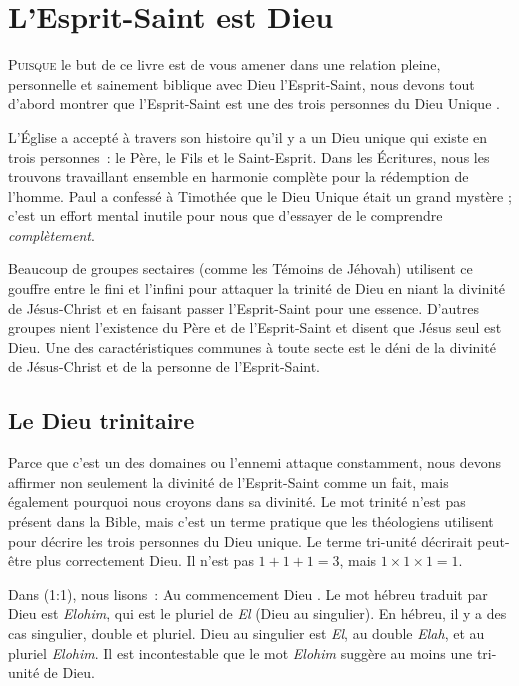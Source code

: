 \chapter{L'Esprit-Saint est Dieu}

\lettrine{P}{uisque} le but de ce livre est de vous amener
 dans une relation pleine, personnelle et sainement biblique avec
 Dieu l'Esprit-Saint, nous devons tout d'abord montrer que l'Esprit-Saint
 est une des trois personnes du Dieu Unique
 .

L'Église a accepté à travers son histoire qu'il y a un Dieu unique
 qui existe en trois personnes~: le Père, le Fils et le Saint-Esprit.
 Dans les Écritures, nous les trouvons travaillant ensemble en harmonie
 complète pour la rédemption de l'homme.
 Paul a confessé à Timothée que le Dieu Unique était un grand mystère ;
 c'est un effort mental inutile pour nous que d'essayer de le comprendre
 \emph{complètement}.

Beaucoup de groupes sectaires (comme les Témoins de Jéhovah) utilisent
 ce gouffre entre le fini et l'infini pour attaquer la trinité de Dieu
 en niant la divinité de Jésus-Christ et en faisant passer l'Esprit-Saint
 pour une essence.
 D'autres groupes nient l'existence du Père et de l'Esprit-Saint et disent
 que Jésus seul est Dieu.
 Une des caractéristiques communes à toute secte est le déni de la divinité
 de Jésus-Christ et de la personne de l'Esprit-Saint.

\section*{Le Dieu trinitaire}

Parce que c'est un des domaines ou l'ennemi attaque constamment, nous devons
 affirmer non seulement la divinité de l'Esprit-Saint comme un fait,
 mais également pourquoi nous croyons dans sa divinité.
 Le mot \og trinité \fg{} n'est pas présent dans la Bible, mais c'est un
 terme pratique que les théologiens utilisent pour décrire les trois personnes
 du Dieu unique.
 Le terme \og tri-unité \fg{} décrirait peut-être plus correctement Dieu.
 Il n'est pas $1 + 1 + 1 = 3$, mais $1 \times 1 \times 1 = 1$.

Dans (1:1), nous lisons~:
 \og Au commencement Dieu \fg{}.
 Le mot hébreu traduit par \og Dieu \fg{} est \emph{Elohim}, qui est
 le pluriel de \emph{El} (Dieu au singulier).
 En hébreu, il y a des cas singulier, double et pluriel.
 \og Dieu \fg{} au singulier est \emph{El}, au double \emph{Elah},
 et au pluriel \emph{Elohim}.
 Il est incontestable que le mot \emph{Elohim} suggère au moins
 une tri-unité de Dieu.


